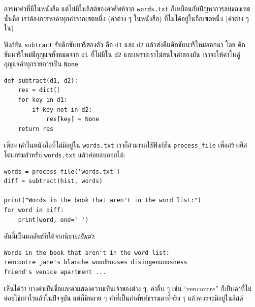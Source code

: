 การหาคำที่มีในหนังสือ แต่ไม่มีในลิสต์ของคำศัพท์จาก \texttt{words.txt}
ก็เหมือนกับปัญหาการลบของเซต
นั่นคือ เราต้องการหาคำทุกคำจากเซตหนึ่ง (คำต่าง ๆ ในหนังสือ) ที่ไม่ได้อยู่ในอีกเซตหนึ่ง (คำต่าง ๆ ใน)


ฟังก์ชัน \texttt{subtract} รับดิกชันนารีสองตัว คือ \texttt{d1} และ \texttt{d2} 
แล้วส่งคืนดิกชันนารีใหม่ออกมา 
โดย ดิกชันนารีใหม่มีกุญแจทั้งหมดจาก \texttt{d1} ที่ไม่มีใน \texttt{d2}
และเพราะเราไม่สนใจค่าของมัน เราจะให้ค่าในคู่กุญแจค่าทุกรายการเป็น \texttt{None}

\begin{verbatim}
def subtract(d1, d2):
    res = dict()
    for key in d1:
        if key not in d2:
            res[key] = None
    return res
\end{verbatim}
%
%
เพื่อหาคำในหนังสือที่ไม่มีอยู่ใน \texttt{words.txt}
เราก็สามารถใช้ฟังก์ชัน \verb|process_file| เพื่อสร้างฮิสโตแกรมสำหรับ \texttt{words.txt} แล้วค่อยลบออกได้:

\begin{verbatim}
words = process_file('words.txt')
diff = subtract(hist, words)

print("Words in the book that aren't in the word list:")
for word in diff:
    print(word, end=' ')
\end{verbatim}
%
%
อันนี้เป็นผลลัพธ์ที่ได้จากนิยาย\textit{เอ็มม่า}:

\begin{verbatim}
Words in the book that aren't in the word list:
rencontre jane's blanche woodhouses disingenuousness 
friend's venice apartment ...
\end{verbatim}
%
%
เห็นได้ว่า บางคำเป็นชื่อและคำแสดงความเป็นเจ้าของต่าง ๆ.
คำอื่น ๆ เช่น ``rencontre'' ก็เป็นคำที่ไม่ค่อยใช้เท่าไรแล้วในปัจจุบัน
แต่ก็มีหลาย ๆ คำที่เป็นคำศัพท์ธรรมดาที่จริง ๆ แล้วควรจะมีอยู่ในลิสต์

